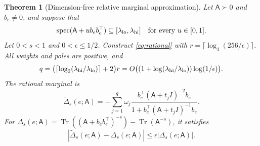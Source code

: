 \documentclass[conference]{IEEEtran}
\newtheorem{theorem}{Theorem}
\theoremstyle{definition}
\DeclareMathOperator{\Tr}{Tr}
\newcommand{\matA}{\mathsf A}
\begin{document}
\begin{theorem}[Dimension-free relative marginal approximation]
\label{thm:dimension-free-marginal}
Let $\matA\succ0$ and $b_e\ne0$, and suppose that
\[
\operatorname{spec}(\matA+u b_eb_e^\top)\subseteq[\lambda_{\rm lo},\lambda_{\rm hi}]
\quad\text{for every }u\in[0,1].
\]
Let $0<s<1$ and $0<\epsilon\le1/2$. Construct \eqref{eq:rational} with $r=\lceil\log_4(256/\epsilon)\rceil$. All weights and poles are positive, and
\[
q=\bigl(\lceil\log_2(\lambda_{\rm hi}/\lambda_{\rm lo})\rceil+2\bigr)r
=O\bigl((1+\log(\lambda_{\rm hi}/\lambda_{\rm lo}))\log(1/\epsilon)\bigr).
\]
The rational marginal is
\begin{equation}
\widetilde\Delta_s(e;\matA)
=-\sum_{j=1}^q\omega_j
\frac{b_e^\top(\matA+t_jI)^{-2}b_e}
{1+b_e^\top(\matA+t_jI)^{-1}b_e}.
\label{eq:multi-pole-marginal}
\end{equation}
For $\Delta_s(e;\matA)=\Tr((\matA+b_eb_e^\top)^{-s})-\Tr(\matA^{-s})$, it satisfies
\begin{equation}
|\widetilde\Delta_s(e;\matA)-\Delta_s(e;\matA)|
\le\epsilon|\Delta_s(e;\matA)|.
\label{eq:dimension-free-marginal}
\end{equation}
\end{theorem}
\end{document}
